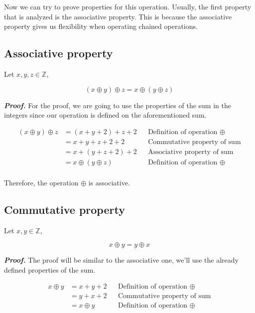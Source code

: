 \documentclass{report}
\begin{document}
    Now we can try to prove properties for this operation. Usually, the first property that is analyzed is the associative property. This is because the associative property gives us flexibility when operating chained operations.

    \subsection*{Associative property}

    Let $x,y, z \in \mathbb{Z}$,

    $$(x\oplus y) \oplus z = x \oplus (y \oplus z)$$

    \textit{\textbf{Proof.}} For the proof, we are going to use the properties of the sum in the integers since our operation is defined on the aforementioned sum.

    \begin{align*}
        (x\oplus y) \oplus z &= (x + y + 2) + z + 2 &&\text{Definition of operation } \oplus\\
        &= x + y + z + 2 + 2 &&\text{Commutative property of sum}\\
        &= x + (y + z + 2) + 2 &&\text{Associative property of sum}\\
        &= x \oplus (y \oplus z) &&\text{Definition of operation } \oplus\\
    \end{align*}

    Therefore, the operation $\oplus$ is associative.

    \subsection*{Commutative property}

    Let $x,y \in \mathbb{Z}$,

    $$x\oplus y = y \oplus x $$

    \textit{\textbf{Proof.}} The proof will be similar to the associative one, we'll use the already defined properties of the sum.

    \begin{align*}
        x\oplus y &= x + y + 2 &&\text{Definition of operation } \oplus\\
        &= y + x + 2 &&\text{Commutative property of sum}\\
        &= x \oplus y &&\text{Definition of operation } \oplus\\
    \end{align*}
\end{document}
